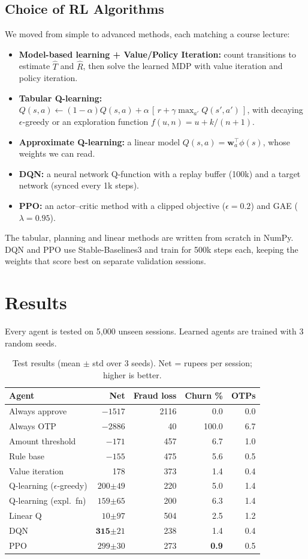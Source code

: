 \documentclass[10pt,twocolumn]{article}
\begin{document}
\subsection{Choice of RL Algorithms}
We moved from simple to advanced methods, each matching a course lecture:
\begin{itemize}
\item \textbf{Model-based learning + Value/Policy Iteration:} count transitions to estimate $\hat T$ and
$\hat R$, then solve the learned MDP with value iteration and policy iteration.
\item \textbf{Tabular Q-learning:}
$Q(s,a)\leftarrow(1{-}\alpha)Q(s,a)+\alpha\,[\,r+\gamma\max_{a'}Q(s',a')\,]$, with decaying $\epsilon$-greedy
or an exploration function $f(u,n){=}u{+}k/(n{+}1)$.
\item \textbf{Approximate Q-learning:} a linear model $Q(s,a)=\mathbf{w}_a^\top\phi(s)$, whose weights we can read.
\item \textbf{DQN:} a neural network Q-function with a replay buffer (100k) and a target network
(synced every 1k steps).
\item \textbf{PPO:} an actor--critic method with a clipped objective ($\epsilon{=}0.2$) and GAE ($\lambda{=}0.95$).
\end{itemize}
The tabular, planning and linear methods are written from scratch in NumPy. DQN and PPO use Stable-Baselines3
and train for 500k steps each, keeping the weights that score best on separate validation sessions.

\section{Results}
Every agent is tested on 5{,}000 unseen sessions. Learned agents are trained with 3 random seeds.

\begin{table}[h]\centering\footnotesize\setlength{\tabcolsep}{3pt}
\caption{Test results (mean $\pm$ std over 3 seeds). Net = rupees per session; higher is better.}
\label{tab:res}
\begin{tabular}{lrrrr}\toprule
Agent & Net & Fraud loss & Churn \% & OTPs\\\midrule
Always approve & $-1517$ & 2116 & 0.0 & 0.0\\
Always OTP & $-2886$ & 40 & 100.0 & 6.7\\
Amount threshold & $-171$ & 457 & 6.7 & 1.0\\
Rule base & $-155$ & 475 & 5.6 & 0.5\\\midrule
Value iteration & 178 & 373 & 1.4 & 0.4\\
Q-learning ($\epsilon$-greedy) & $200{\scriptstyle\pm49}$ & 220 & 5.0 & 1.4\\
Q-learning (expl.\ fn) & $159{\scriptstyle\pm65}$ & 200 & 6.3 & 1.4\\
Linear Q & $10{\scriptstyle\pm97}$ & 504 & 2.5 & 1.2\\
DQN & $\mathbf{315}{\scriptstyle\pm21}$ & 238 & 1.4 & 0.4\\
PPO & $299{\scriptstyle\pm30}$ & 273 & \textbf{0.9} & 0.5\\\bottomrule
\end{tabular}\end{table}
\end{document}
